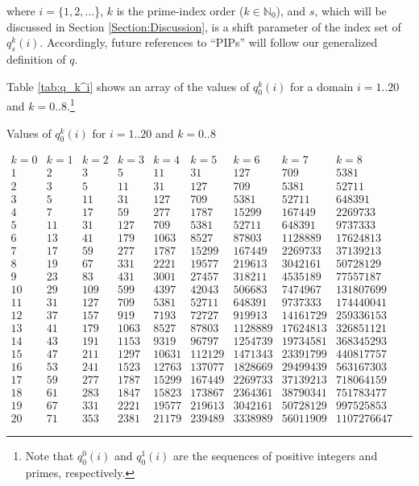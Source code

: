 \documentclass[12pt,longtitle,times]{amsart}
\begin{document}
where $i = \{1,2,\dots$\}, $k$ is the prime-index order ($k \in \mathbb{N}_0$), and $s$, which will be discussed in Section \ref{Section:Discussion}, is a shift parameter of the index set of $q_s^k(i)$. Accordingly, future references to ``PIPs'' will follow our generalized definition of $q$.

Table \ref{tab:q_k^i} shows an array of the values of $q_0^k(i)$ for a domain $i = 1..20$ and $k = 0..8$.\footnote{Note that $q_{0}^0(i)$ and $q_{0}^1(i)$ are the sequences of positive integers and primes, respectively.} 

\begin{table}[h]
\centering
\fontsize{10pt}{0}
\caption{Values of $q_0^k(i)$ for $i = 1..20$ and $k = 0..8$}
$\begin{array}{ccccccccc} k=0 & k=1 & k=2 & k=3 & k=4 & k=5 & k=6 & k=7 & k=8\\ 
\hline
1 & 2 & 3 & 5 & 11 & 31 & 127 & 709 & 5381\\ 2 & 3 & 5 & 11 & 31 & 127 & 709 & 5381 & 52711\\ 3 & 5 & 11 & 31 & 127 & 709 & 5381 & 52711 & 648391\\ 4 & 7 & 17 & 59 & 277 & 1787 & 15299 & 167449 & 2269733\\ 5 & 11 & 31 & 127 & 709 & 5381 & 52711 & 648391 & 9737333\\ 6 & 13 & 41 & 179 & 1063 & 8527 & 87803 & 1128889 & 17624813\\ 7 & 17 & 59 & 277 & 1787 & 15299 & 167449 & 2269733 & 37139213\\ 8 & 19 & 67 & 331 & 2221 & 19577 & 219613 & 3042161 & 50728129\\ 9 & 23 & 83 & 431 & 3001 & 27457 & 318211 & 4535189 & 77557187\\ 10 & 29 & 109 & 599 & 4397 & 42043 & 506683 & 7474967 & 131807699\\ 11 & 31 & 127 & 709 & 5381 & 52711 & 648391 & 9737333 & 174440041\\ 12 & 37 & 157 & 919 & 7193 & 72727 & 919913 & 14161729 & 259336153\\ 13 & 41 & 179 & 1063 & 8527 & 87803 & 1128889 & 17624813 & 326851121\\ 14 & 43 & 191 & 1153 & 9319 & 96797 & 1254739 & 19734581 & 368345293\\ 15 & 47 & 211 & 1297 & 10631 & 112129 & 1471343 & 23391799 & 440817757\\ 16 & 53 & 241 & 1523 & 12763 & 137077 & 1828669 & 29499439 & 563167303\\ 17 & 59 & 277 & 1787 & 15299 & 167449 & 2269733 & 37139213 & 718064159\\ 18 & 61 & 283 & 1847 & 15823 & 173867 & 2364361 & 38790341 & 751783477\\ 19 & 67 & 331 & 2221 & 19577 & 219613 & 3042161 & 50728129 & 997525853\\ 20 & 71 & 353 & 2381 & 21179 & 239489 & 3338989 & 56011909 & 1107276647 \end{array}$
\label{tab:q_k^i}
\end{table}
\end{document}
